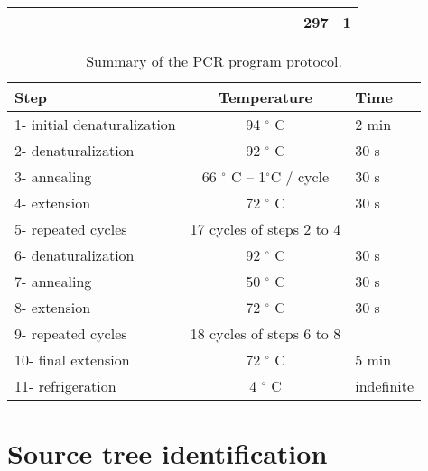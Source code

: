 \documentclass[a4paper,12pt]{article}
\begin{document}
\begin{landscape}
\begin{table}
\begin{tabular}{rrrrrrrrrrrrrrrrrrrrrr}
           &            &            &            &            &            &            &            &            &            &            &            &            &            &            &            &            &            &            &            &        297 &          1 \\
\toprule
\end{tabular}
\end{table}
\end{landscape}

\begin{table}
\caption{Summary of the PCR program protocol.}
\vspace{0.2cm}

\begin{tabular}{lcl}

\toprule
Step  &  Temperature  &       Time \\
\toprule
1- initial denaturalization  &  94 \ensuremath{^\circ} C  &      2 min \\
2- denaturalization  &  92 \ensuremath{^\circ} C  &       30 s \\
3- annealing  &  66 \ensuremath{^\circ} C -- 1\ensuremath{^\circ}C / cycle  &       30 s \\
4- extension  &  72 \ensuremath{^\circ} C  &       30 s \\
5- repeated cycles  &  17 cycles of steps 2 to 4  &            \\
6- denaturalization  &  92 \ensuremath{^\circ} C  &       30 s \\
7- annealing  &  50 \ensuremath{^\circ} C  &       30 s \\
8- extension  &  72 \ensuremath{^\circ} C  &       30 s \\
9- repeated cycles  &  18 cycles of steps 6 to 8  &            \\
10- final extension  &  72 \ensuremath{^\circ} C  &      5 min \\
11- refrigeration  &  4 \ensuremath{^\circ} C  &  indefinite \\
\toprule
\end{tabular}
\end{table}

\section{Source tree identification}
\end{document}
